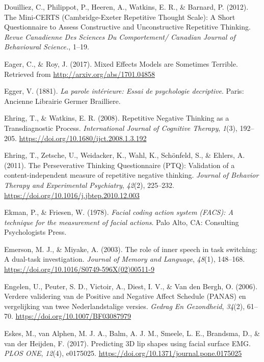 \documentclass[a4paper,12pt,twoside,openright,oldfontcommands]{memoir}
\begin{document}
\leavevmode\hypertarget{ref-Douilliez2012}{}%
Douilliez, C., Philippot, P., Heeren, A., Watkins, E. R., \& Barnard, P. (2012). The Mini-CERTS (Cambridge-Exeter Repetitive Thought Scale): A Short Questionnaire to Assess Constructive and Unconstructive Repetitive Thinking. \emph{Revue Canadienne Des Sciences Du Comportement/ Canadian Journal of Behavioural Science.}, 1--19.

\leavevmode\hypertarget{ref-eager_mixed_2017}{}%
Eager, C., \& Roy, J. (2017). Mixed Effects Models are Sometimes Terrible. Retrieved from \url{http://arxiv.org/abs/1701.04858}

\leavevmode\hypertarget{ref-egger_parole_1881}{}%
Egger, V. (1881). \emph{La parole intérieure: Essai de psychologie decriptive}. Paris: Ancienne Librairie Germer Brailliere.

\leavevmode\hypertarget{ref-ehring_repetitive_2008}{}%
Ehring, T., \& Watkins, E. R. (2008). Repetitive Negative Thinking as a Transdiagnostic Process. \emph{International Journal of Cognitive Therapy}, \emph{1}(3), 192--205. \url{https://doi.org/10.1680/ijct.2008.1.3.192}

\leavevmode\hypertarget{ref-Ehring2011}{}%
Ehring, T., Zetsche, U., Weidacker, K., Wahl, K., Schönfeld, S., \& Ehlers, A. (2011). The Perseverative Thinking Questionnaire (PTQ): Validation of a content-independent measure of repetitive negative thinking. \emph{Journal of Behavior Therapy and Experimental Psychiatry}, \emph{42}(2), 225--232. \url{https://doi.org/10.1016/j.jbtep.2010.12.003}

\leavevmode\hypertarget{ref-ekman_facial_1978}{}%
Ekman, P., \& Friesen, W. (1978). \emph{Facial coding action system (FACS): A technique for the measurement of facial actions}. Palo Alto, CA: Consulting Psychologists Press.

\leavevmode\hypertarget{ref-emerson_role_2003}{}%
Emerson, M. J., \& Miyake, A. (2003). The role of inner speech in task switching: A dual-task investigation. \emph{Journal of Memory and Language}, \emph{48}(1), 148--168. \url{https://doi.org/10.1016/S0749-596X(02)00511-9}

\leavevmode\hypertarget{ref-engelen_verdere_2006}{}%
Engelen, U., Peuter, S. D., Victoir, A., Diest, I. V., \& Van den Bergh, O. (2006). Verdere validering van de Positive and Negative Affect Schedule (PANAS) en vergelijking van twee Nederlandstalige versies. \emph{Gedrag En Gezondheid}, \emph{34}(2), 61--70. \url{https://doi.org/10.1007/BF03087979}

\leavevmode\hypertarget{ref-eskes_predicting_2017}{}%
Eskes, M., van Alphen, M. J. A., Balm, A. J. M., Smeele, L. E., Brandsma, D., \& van der Heijden, F. (2017). Predicting 3D lip shapes using facial surface EMG. \emph{PLOS ONE}, \emph{12}(4), e0175025. \url{https://doi.org/10.1371/journal.pone.0175025}
\end{document}
